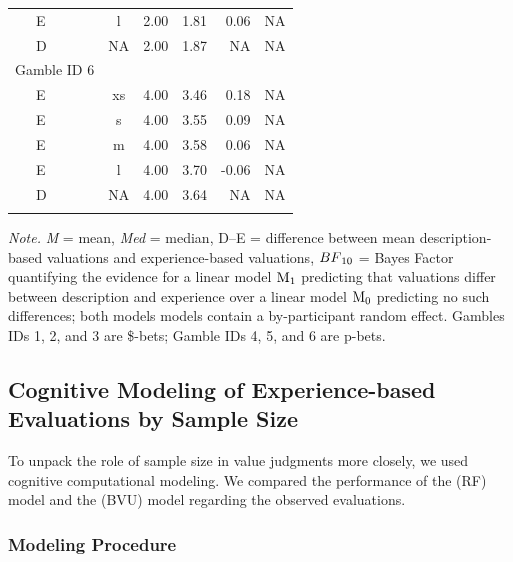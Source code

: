 \documentclass[a4paper, man, floatsintext]{apa6}
\begin{document}
\begin{table}[tbp]
\begin{center}
\begin{threeparttable}
\begin{tabular}{lcccrr}
\ \ \ E & l & 2.00 & 1.81 & 0.06 & NA\\
\ \ \ D & NA & 2.00 & 1.87 & NA & NA\\
Gamble ID 6 &  &  &  &  & \\
\ \ \ E & xs & 4.00 & 3.46 & 0.18 & NA\\
\ \ \ E & s & 4.00 & 3.55 & 0.09 & NA\\
\ \ \ E & m & 4.00 & 3.58 & 0.06 & NA\\
\ \ \ E & l & 4.00 & 3.70 & -0.06 & NA\\
\ \ \ D & NA & 4.00 & 3.64 & NA & NA\\
\bottomrule
\addlinespace
\end{tabular}
\begin{tablenotes}[para]
\normalsize{\textit{Note.} \textit{M} = mean, \textit{Med} = median, D--E = difference between mean description-based valuations and experience-based valuations, $BF\textsubscript{10}$ = Bayes Factor quantifying the evidence for a linear model $\mathrm{M}\textsubscript{1}$ predicting that valuations differ between description and experience over a linear model $\mathrm{M}\textsubscript{0}$ predicting no such differences; both models models contain a by-participant random effect. Gambles IDs 1, 2, and 3 are \$-bets; Gamble IDs 4, 5, and 6 are p-bets.}
\end{tablenotes}
\end{threeparttable}
\end{center}
\end{table}

\subsection{Cognitive Modeling of Experience-based Evaluations by Sample Size}

To unpack the role of sample size in value judgments more closely, we
used cognitive computational modeling. We compared the performance of
the  (RF) model and the
 (BVU) model regarding the
observed evaluations.

\subsubsection{Modeling Procedure}
\end{document}
